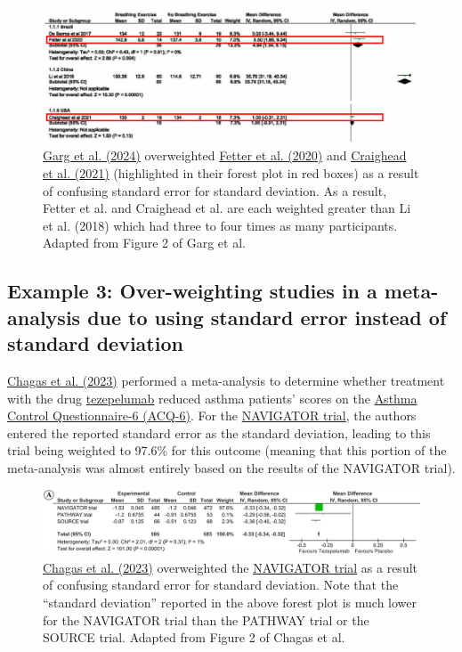 \documentclass[letterpaper, 12pt]{article}
\begin{document}
\begin{figure}[h!tbp]
    \includegraphics[width=\textwidth]{img/sd_vs_se/garg_problem.PNG}
    \caption*{\href{https://doi.org/10.1016/j.ijcrp.2023.200232}{Garg et al. (2024)} overweighted \href{https://doi.org/10.3389/fphys.2020.00898}{Fetter et al. (2020)} and \href{https://doi.org/10.1161/JAHA.121.020980}{Craighead et al. (2021)} (highlighted in their forest plot in red boxes) as a result of confusing standard error for standard deviation. As a result, Fetter et al. and Craighead et al. are each weighted greater than Li et al. (2018) which had three to four times as many participants. Adapted from Figure 2 of Garg et al.}
\end{figure}

\subsection*{Example 3: Over-weighting studies in a meta-analysis due to using standard error instead of standard deviation}

\href{https://doi.org/10.1007/s11882-023-01085-y}{Chagas et al. (2023)} performed a meta-analysis to determine whether treatment with the drug \href{https://en.wikipedia.org/wiki/Tezepelumab}{tezepelumab} reduced asthma patients' scores on the \href{http://www.qoltech.co.uk/acq.html}{Asthma Control Questionnaire-6 (ACQ-6)}. For the \href{https://doi.org/10.1056/NEJMoa2034975}{NAVIGATOR trial}, the authors entered the reported standard error as the standard deviation, leading to this trial being weighted to 97.6\% for this outcome (meaning that this portion of the meta-analysis was almost entirely based on the results of the NAVIGATOR trial).

\begin{figure}[h!tbp]
    \includegraphics[width=\textwidth]{img/sd_vs_se/chagas_problem.png}
    \caption*{\href{https://doi.org/10.1007/s11882-023-01085-y}{Chagas et al. (2023)} overweighted the \href{https://doi.org/10.1056/NEJMoa2034975}{NAVIGATOR trial} as a result of confusing standard error for standard deviation. Note that the ``standard deviation'' reported in the above forest plot is much lower for the NAVIGATOR trial than the PATHWAY trial or the SOURCE trial. Adapted from Figure 2 of Chagas et al.}
\end{figure}
\end{document}
